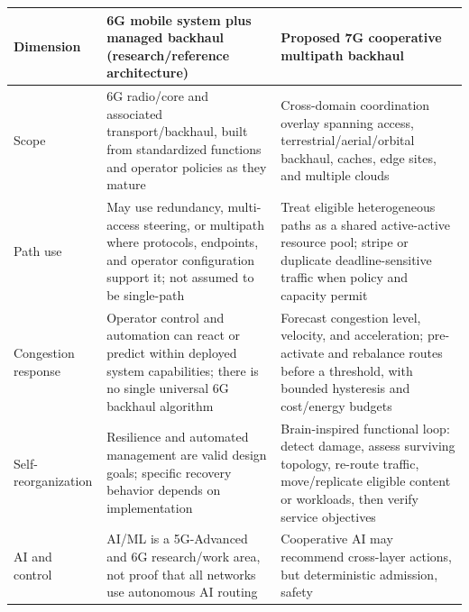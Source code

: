 \documentclass[
  american,
  11pt,
]{article}
\newcounter{none} %
\begin{document}
{\def\LTcaptype{none} %
\begin{longtable}[]{@{}
  >{\raggedright\arraybackslash}p{}
  >{\raggedright\arraybackslash}p{}
  >{\raggedright\arraybackslash}p{}@{}}
\toprule\noalign{}
\begin{minipage}[b]{\linewidth}\raggedright
Dimension
\end{minipage} & \begin{minipage}[b]{\linewidth}\raggedright
6G mobile system plus managed backhaul (research/reference architecture)
\end{minipage} & \begin{minipage}[b]{\linewidth}\raggedright
Proposed 7G cooperative multipath backhaul
\end{minipage} \\
\midrule\noalign{}
\endhead
\bottomrule\noalign{}
\endlastfoot
Scope & 6G radio/core and associated transport/backhaul, built from
standardized functions and operator policies as they mature &
Cross-domain coordination overlay spanning access,
terrestrial/aerial/orbital backhaul, caches, edge sites, and multiple
clouds \\
Path use & May use redundancy, multi-access steering, or multipath where
protocols, endpoints, and operator configuration support it; not assumed
to be single-path & Treat eligible heterogeneous paths as a shared
active-active resource pool; stripe or duplicate deadline-sensitive
traffic when policy and capacity permit \\
Congestion response & Operator control and automation can react or
predict within deployed system capabilities; there is no single
universal 6G backhaul algorithm & Forecast congestion level, velocity,
and acceleration; pre-activate and rebalance routes before a threshold,
with bounded hysteresis and cost/energy budgets \\
Self-reorganization & Resilience and automated management are valid
design goals; specific recovery behavior depends on implementation &
Brain-inspired functional loop: detect damage, assess surviving
topology, re-route traffic, move/replicate eligible content or
workloads, then verify service objectives \\
AI and control & AI/ML is a 5G-Advanced and 6G research/work area, not
proof that all networks use autonomous AI routing & Cooperative AI may
recommend cross-layer actions, but deterministic admission, safety

\end{longtable}}
\end{document}
